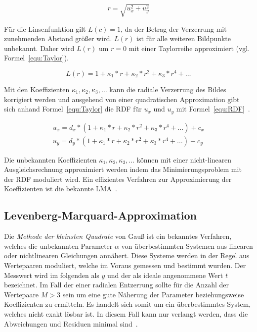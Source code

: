 \begin{equation}
\label{equ:Abstand}
r = \sqrt{u_x^2+u_y^2}
\end{equation}

 Für die Linsenfunktion gilt $L(c)=1$, da der Betrag der Verzerrung mit zunehmenden Abstand größer wird. $L(r)$ ist für alle weiteren Bildpunkte unbekannt. Daher wird $L(r)$ um $r=0$ mit einer Taylorreihe approximiert (vgl. Formel~\ref{equ:Taylor}). 
 
 \begin{equation}
 \label{equ:Taylor}
 L(r)=1+\kappa_1*r+\kappa_2*r^2+\kappa_3*r^4 + \dots
 \end{equation}

Mit den Koeffizienten $\kappa_1, \kappa_2, \kappa_3, \dots$ kann die radiale Verzerrung des Bildes korrigiert werden und ausgehend von einer quadratischen Approximation gibt sich anhand Formel~\ref{equ:Taylor} die RDF für $u_x$ und $u_y$ mit Formel~\ref{equ:RDF}~\cite{WangRaddist}.

\begin{equation}
\label{equ:RDF}
\begin{split}
u_x = d_x*(1+\kappa_1*r+\kappa_2*r^2+\kappa_3*r^4 + \dots) + c_x\\
u_y = d_y*(1+\kappa_1*r+\kappa_2*r^2+\kappa_3*r^4 + \dots) + c_y
\end{split}
\end{equation}

Die unbekannten Koeffizienten $\kappa_1, \kappa_2, \kappa_3, \dots$ können mit einer nicht-linearen Ausgleichsrechnung approximiert werden indem das Minimierungsproblem mit der RDF moduliert wird. Ein effizientes Verfahren zur Approximierung der Koeffizienten ist die bekannte LMA~\cite{LevMarquardt}.
\subsection{Levenberg-Marquard-Approximation}
Die \textit{Methode der kleinsten Quadrate} von Gauß ist ein bekanntes Verfahren, welches die unbekannten Parameter $\alpha$ von überbestimmten Systemen aus linearen oder nichtlinearen Gleichungen annähert. Diese Systeme werden in der Regel aus Wertepaaren moduliert, welche im Voraus gemessen und bestimmt wurden. Der Messwert wird im folgenden als $y$ und der als ideale angenommene Wert $t$ bezeichnet.
Im Fall der einer radialen Entzerrung sollte für die Anzahl der Wertepaare $M>3$ sein um eine gute Näherung der Parameter beziehungsweise Koeffizienten zu ermitteln.
Es handelt sich somit um ein überbestimmtes System, welches nicht exakt lösbar ist. In diesem Fall kann nur verlangt werden, dass die Abweichungen und Residuen minimal sind~\cite{schwarz2011numerische}. 

